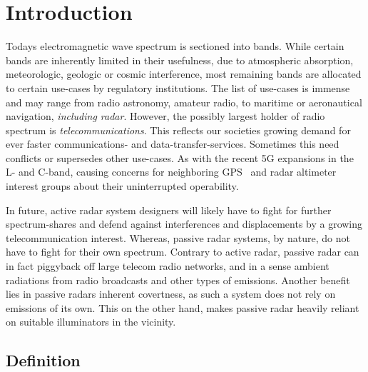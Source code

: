 \chapter{Introduction}\label{chp:introduction}

Todays electromagnetic wave spectrum is sectioned into bands. While certain bands are inherently limited in their usefulness, due to atmospheric absorption, meteorologic, geologic or cosmic interference, most remaining bands are allocated to certain use-cases by regulatory institutions. The list of use-cases is immense and may range from radio astronomy, amateur radio, to maritime or aeronautical navigation, \emph{including radar}. However, the possibly largest holder of radio spectrum is \emph{telecommunications}. This reflects our societies growing demand for ever faster communications- and data-transfer-services. Sometimes this need conflicts or supersedes other use-cases. As with the recent 5G expansions in the L- and C-band, causing concerns for neighboring GPS~\cite{GPS.gov2020} and radar altimeter~\cite{RTCA2020} interest groups about their uninterrupted operability.

In future, active radar system designers will likely have to fight for further spectrum-shares and defend against interferences and displacements by a growing telecommunication interest. Whereas, passive radar systems, by nature, do not have to fight for their own spectrum. Contrary to active radar, passive radar can in fact piggyback off large telecom radio networks, and in a sense  ambient radiations from radio broadcasts and other types of emissions. Another benefit lies in passive radars inherent covertness, as such a system does not rely on emissions of its own. This on the other hand, makes passive radar heavily reliant on suitable illuminators in the vicinity.

\section{Definition}

